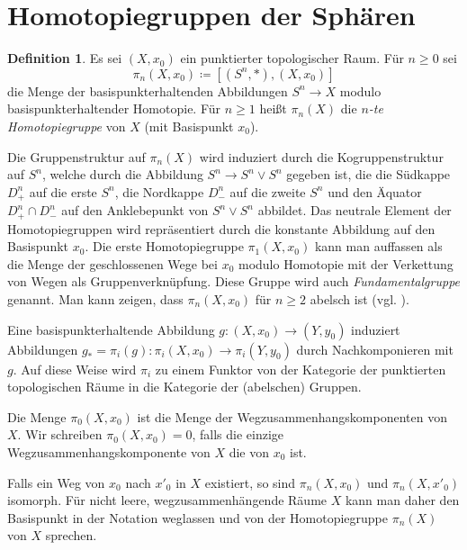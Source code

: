 \documentclass[11pt, a4paper, german]{article}
\theoremstyle{definition}
\newtheorem{defn}[lem]{Definition}
\theoremstyle{remark}
\begin{document}


\tableofcontents
\newpage


\section{Homotopiegruppen der Sphären}

\begin{defn}
  Es sei $(X, x_0)$ ein punktierter topologischer Raum.
  Für $n \geq 0$ sei
  \[ \pi_n(X, x_0) \coloneqq [(S^n, *), (X, x_0)] \]
  die Menge der basispunkterhaltenden Abbildungen $S^n \to X$ modulo basispunkterhaltender Homotopie.
  Für $n \geq 1$ heißt $\pi_n(X)$ die \emph{$n$-te Homotopiegruppe} von $X$ (mit Basispunkt $x_0$).
\end{defn}

Die Gruppenstruktur auf $\pi_n(X)$ wird induziert durch die Kogruppenstruktur auf $S^n$, welche durch die Abbildung $S^n \to S^n \vee S^n$ gegeben ist, die die Südkappe $D^n_+$ auf die erste $S^n$, die Nordkappe $D^n_{-}$ auf die zweite $S^n$ und den Äquator $D^n_{+} \cap D^n_{-}$ auf den Anklebepunkt von $S^n \vee S^n$ abbildet.
Das neutrale Element der Homotopiegruppen wird repräsentiert durch die konstante Abbildung auf den Basispunkt $x_0$.
Die erste Homotopiegruppe $\pi_1(X, x_0)$ kann man auffassen als die Menge der geschlossenen Wege bei $x_0$ modulo Homotopie mit der Verkettung von Wegen als Gruppenverknüpfung.
Diese Gruppe wird auch \emph{Fundamentalgruppe} genannt.
Man kann zeigen, dass $\pi_n(X, x_0)$ für $n \geq 2$ abelsch ist (vgl. \cite[340]{hatcher:at}).

Eine basispunkterhaltende Abbildung $g : (X, x_0) \to (Y, y_0)$ induziert Abbildungen $g_* = \pi_i(g) : \pi_i(X, x_0) \to \pi_i(Y, y_0)$ durch Nachkomponieren mit $g$.
Auf diese Weise wird $\pi_i$ zu einem Funktor von der Kategorie der punktierten topologischen Räume in die Kategorie der (abelschen) Gruppen.

Die Menge $\pi_0(X, x_0)$ ist die Menge der Wegzusammenhangskomponenten von $X$.
Wir schreiben $\pi_0(X, x_0) = 0$, falls die einzige Wegzusammenhangskomponente von $X$ die von $x_0$ ist.

Falls ein Weg von $x_0$ nach $x'_0$ in $X$ existiert, so sind $\pi_n(X, x_0)$ und $\pi_n(X, x'_0)$ isomorph.
Für nicht leere, wegzusammenhängende Räume $X$ kann man daher den Basispunkt in der Notation weglassen und von der Homotopiegruppe $\pi_n(X)$ von $X$ sprechen.
\end{document}
